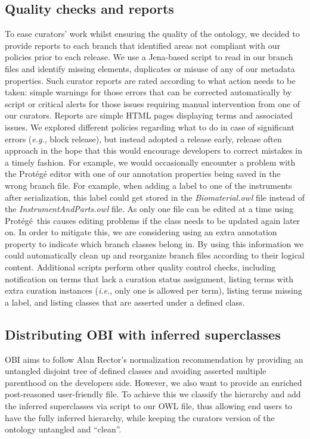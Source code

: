 \documentclass{elsart}       %
\begin{document}
\subsection{Quality checks and reports}

To ease curators' work whilst ensuring the quality of the ontology, we decided to provide reports to each branch that identified areas not compliant with our policies prior to each release.
We use a Jena-based\cite{jena} script to read in our branch files and identify missing elements, duplicates or misuse of any of our metadata properties.
Such curator reports are rated according to what action needs to be taken: simple warnings for those errors that can be corrected automatically by script or critical alerts for those issues requiring manual intervention from one of our curators. Reports are simple HTML pages displaying terms and associated issues.
We explored different policies regarding what to do in case of significant errors (\emph{e.g.}, block release), but instead adopted a release early, release often approach in the hope that this would encourage developers to correct mistakes in a timely fashion.
For example, we would occasionally encounter a problem with the Prot\'eg\'e\cite{protege} editor with one of our annotation properties being saved in the wrong branch file. For example, when adding a label to one of the instruments after serialization, this label could get stored in the \emph{Biomaterial.owl} file instead of the \emph{InstrumentAndParts.owl} file. 
As only one file can be edited at a time using Prot\'eg\'e\, this causes editing problems if the class needs to be updated again later on.
In order to mitigate this, we are considering using an extra annotation property to indicate which branch classes belong in.
By using this information we could automatically clean up and reorganize branch files according to their logical content.
Additional scripts perform other quality control checks, including notification on terms that lack a curation status assignment, listing terms with extra curation instances (\emph{i.e.}, only one is allowed per term), listing terms missing a label, and listing classes that are asserted under a defined class.

\subsection{Distributing OBI with inferred superclasses}

OBI aims to follow Alan Rector's\cite{rector} normalization recommendation by providing an untangled disjoint tree of defined classes and avoiding asserted multiple parenthood on the developers side. However, we also want to provide an enriched post-reasoned user-friendly file.
To achieve this we classify the hierarchy and add the inferred superclasses via script to our OWL file, thus allowing end users to have the fully inferred hierarchy, while keeping the curators version of the ontology untangled and ``clean''.
\end{document}
